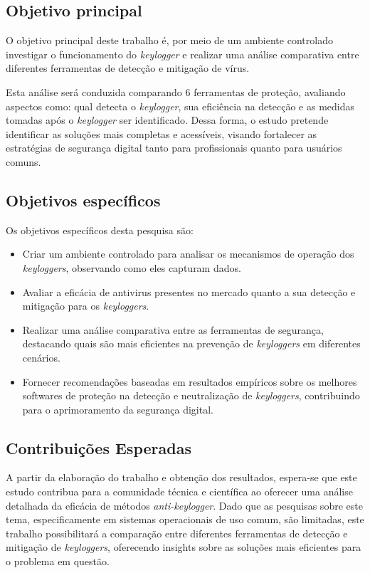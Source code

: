 \documentclass[12pt]{article}
\begin{document}
\subsection{Objetivo principal}
O objetivo principal deste trabalho é, por meio de um ambiente controlado 
investigar o funcionamento do \textit{keylogger} 
e realizar uma análise comparativa entre diferentes ferramentas de detecção e mitigação de vírus.

Esta análise será conduzida comparando 6 ferramentas de proteção, 
avaliando aspectos como: qual detecta o \textit{keylogger}, 
sua eficiência na detecção e as medidas tomadas após o \textit{keylogger} ser identificado. Dessa forma, 
o estudo pretende identificar as soluções mais completas e acessíveis, visando fortalecer 
as estratégias de segurança digital tanto para profissionais quanto para usuários comuns.

\subsection{Objetivos específicos}

Os objetivos específicos desta pesquisa são:
\begin{itemize}
    \item Criar um ambiente controlado para analisar os mecanismos de operação dos \textit{keyloggers}, observando como eles capturam dados.
    \item Avaliar a eficácia de antivirus presentes no mercado quanto a sua detecção e mitigação para os \textit{keyloggers}.
    \item Realizar uma análise comparativa entre as ferramentas de segurança, destacando quais são mais eficientes na prevenção de \textit{keyloggers} em diferentes cenários.
    \item Fornecer recomendações baseadas em resultados empíricos sobre os melhores softwares de proteção 
    na detecção e neutralização de \textit{keyloggers}, contribuindo para o aprimoramento da segurança digital.
\end{itemize}

\subsection{Contribuições Esperadas}
A partir da elaboração do trabalho e obtenção dos resultados, espera-se que este estudo contribua para a comunidade técnica e científica ao oferecer uma análise detalhada da eficácia de métodos \textit{anti-keylogger}. Dado que as pesquisas sobre este tema, especificamente em sistemas operacionais de uso comum, são limitadas, este trabalho possibilitará a comparação entre diferentes ferramentas de detecção e mitigação de \textit{keyloggers}, oferecendo insights sobre as soluções mais eficientes para o problema em questão.
\end{document}
